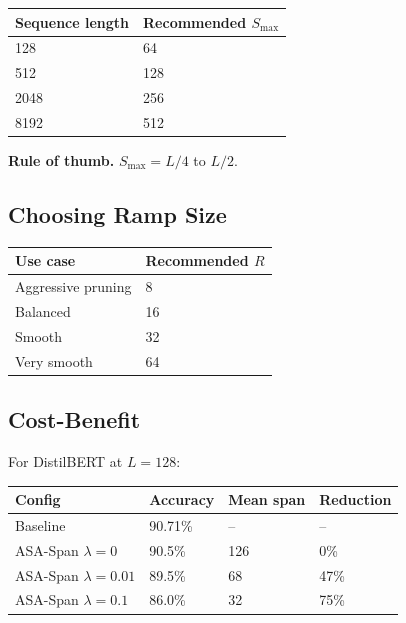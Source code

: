 \begin{table}[H]
\centering
\small
\begin{tabular}{ll}
\toprule
\textbf{Sequence length} & \textbf{Recommended $S_\text{max}$} \\
\midrule
128 & 64 \\
512 & 128 \\
2048 & 256 \\
8192 & 512 \\
\bottomrule
\end{tabular}
\end{table}

\textbf{Rule of thumb.} $S_\text{max} = L / 4$ to $L / 2$.

\subsection{Choosing Ramp Size}

\begin{table}[H]
\centering
\small
\begin{tabular}{ll}
\toprule
\textbf{Use case} & \textbf{Recommended $R$} \\
\midrule
Aggressive pruning & 8 \\
Balanced & 16 \\
Smooth & 32 \\
Very smooth & 64 \\
\bottomrule
\end{tabular}
\end{table}

\subsection{Cost-Benefit}

For DistilBERT at $L = 128$:

\begin{table}[H]
\centering
\small
\begin{tabular}{llll}
\toprule
\textbf{Config} & \textbf{Accuracy} & \textbf{Mean span} & \textbf{Reduction} \\
\midrule
Baseline & 90.71\% & -- & -- \\
ASA-Span $\lambda=0$ & 90.5\% & 126 & 0\% \\
ASA-Span $\lambda=0.01$ & 89.5\% & 68 & 47\% \\
ASA-Span $\lambda=0.1$ & 86.0\% & 32 & 75\% \\
\bottomrule
\end{tabular}
\end{table}

